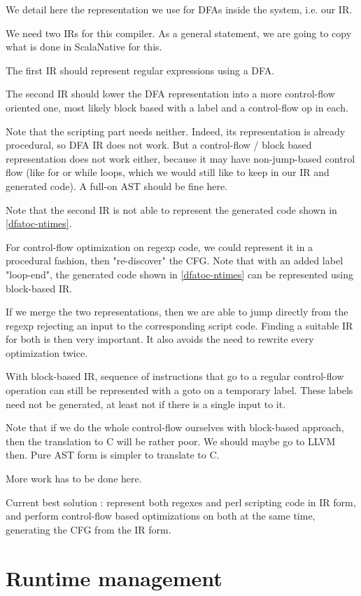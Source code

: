 \documentclass[11pt,a4paper]{report}
\begin{document}
We detail here the representation we use for DFAs inside the system, i.e. our IR.

We need two IRs for this compiler. As a general statement, we are going to copy what is done in ScalaNative for this.

The first IR should represent regular expressions using a DFA.

The second IR should lower the DFA representation into a more control-flow oriented one, most likely block based with a label and a control-flow op in each.

Note that the scripting part needs neither. Indeed, its representation is already procedural, so DFA IR does not work. But a control-flow / block based representation does not work either,  because it may have non-jump-based control flow (like for or while loops, which we would still like to keep in our IR and generated code). A full-on AST should be fine here.

Note that the second IR is not able to represent the generated code shown in \ref{dfatoc-ntimes}.

For control-flow optimization on regexp code, we could represent it in a procedural fashion, then "re-discover" the CFG. Note that with an added label "loop-end", the generated code shown in \ref{dfatoc-ntimes} can be represented using block-based IR.

If we merge the two representations, then we are able to jump directly from the regexp rejecting an input to the corresponding script code. Finding a suitable IR for both is then very important. It also avoids the need to rewrite every optimization twice.

With block-based IR, sequence of instructions that go to a regular control-flow operation can still be represented with a goto on a temporary label. These labels need not be generated, at least not if there is a single input to it.

Note that if we do the whole control-flow ourselves with block-based approach, then the translation to C will be rather poor. We should maybe go to LLVM then. Pure AST form is simpler to translate to C.

More work has to be done here.

Current best solution : represent both regexes and perl scripting code in IR form, and perform control-flow based optimizations on both at the same time, generating the CFG from the IR form.

\chapter{Runtime management}
\end{document}
